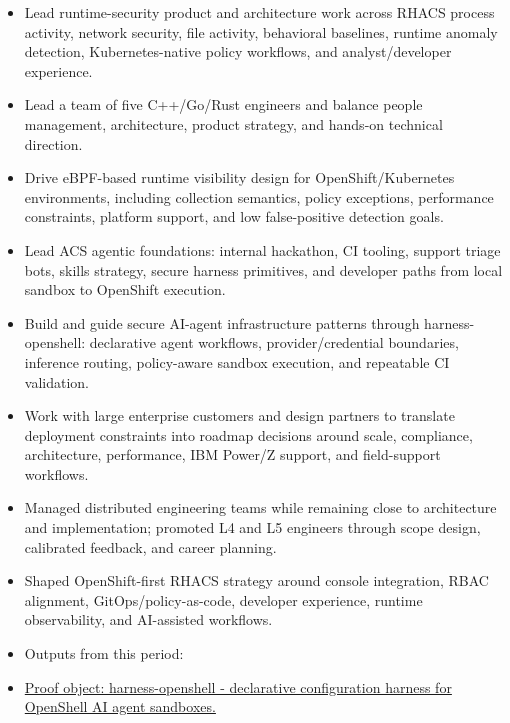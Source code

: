 \documentclass[10pt,letterpaper]{article}
\begin{document}
\begin{itemize}

  \item Lead runtime-security product and architecture work across RHACS process activity, network security, file activity, behavioral baselines, runtime anomaly detection, Kubernetes-native policy workflows, and analyst/developer experience.

  \item Lead a team of five C++/Go/Rust engineers and balance people management, architecture, product strategy, and hands-on technical direction.

  \item Drive eBPF-based runtime visibility design for OpenShift/Kubernetes environments, including collection semantics, policy exceptions, performance constraints, platform support, and low false-positive detection goals.

  \item Lead ACS agentic foundations: internal hackathon, CI tooling, support triage bots, skills strategy, secure harness primitives, and developer paths from local sandbox to OpenShift execution.

  \item Build and guide secure AI-agent infrastructure patterns through harness-openshell: declarative agent workflows, provider/credential boundaries, inference routing, policy-aware sandbox execution, and repeatable CI validation.

  \item Work with large enterprise customers and design partners to translate deployment constraints into roadmap decisions around scale, compliance, architecture, performance, IBM Power/Z support, and field-support workflows.

  \item Managed distributed engineering teams while remaining close to architecture and implementation; promoted L4 and L5 engineers through scope design, calibrated feedback, and career planning.

  \item Shaped OpenShift-first RHACS strategy around console integration, RBAC alignment, GitOps/policy-as-code, developer experience, runtime observability, and AI-assisted workflows.

  \item Outputs from this period:

  \item \href{https://github.com/stackrox/harness-openshell}{Proof object: harness-openshell - declarative configuration harness for OpenShell AI agent sandboxes.}


\end{itemize}
\end{document}
